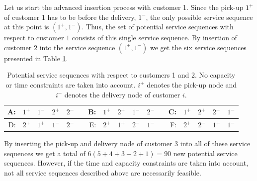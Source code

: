 \documentclass[dissertation,draft*]{aaltoseries}
\begin{document}
Let us start the advanced insertion process with customer 1.
Since the pick-up $1^{+}$ of customer 1 has to be before the delivery, $1^{-}$, 
the only possible service sequence at this point is $( 1^{+},  1^{-})$. Thus, the 
set of potential service sequences with respect to customer $1$ consists of this single service sequence. 
By insertion of customer $2$ into the service sequence $( 1^{+}, 1^{-})$ we get the six 
service sequences presented in Table \ref{ykskakstaulukko01}.
\begin{table}[ht] 
\caption{Potential service sequences with respect to customers 1 and 2. 
No capacity or time constraints are taken into account. 
$i^{+}$ denotes the pick-up node and $i^{-}$ denotes
the delivery node of customer $i$.} 
\centering     
\begin{tabular}{|rrrrrr|rrrrrr|rrrrr|}  
\hline  %
A: & $ 1^{+} $ & $  1^{-} $ & $  2^{+} $ & $  2^{-} $ & & 
B: & $ 1^{+} $ & $  2^{+} $ & $  1^{-} $ & $  2^{-} $ & & 
C: & $ 1^{+} $ & $  2^{+} $ & $  2^{-} $ & $  1^{-} $ \\ %
\hline  %
D: & $ 2^{+} $ & $  1^{+} $ & $  1^{-} $ & $  2^{-} $ & & 
E: & $ 2^{+} $ & $  1^{+} $ & $ 2^{-} $ & $  1^{-} $ & & 
F: & $ 2^{+} $ & $  2^{-} $ & $  1^{+} $ & $  1^{-} $ \\ %
\hline                      
\end{tabular} 
\label{ykskakstaulukko01} 
\end{table} 


By inserting the pick-up and delivery node of customer $3$ into all of these service sequences we get a total
of $6(5+4+3+2+1) = 90$ new potential service sequences. However, if the time and capacity
constraints are taken into account, not all service sequences described above are necessarily feasible.

\end{document}

